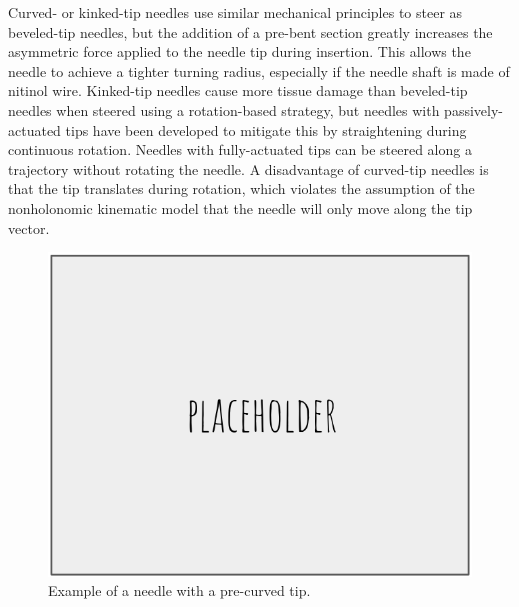 Curved- or kinked-tip needles use similar mechanical principles to steer as beveled-tip needles, but the addition of a pre-bent section greatly increases the asymmetric force applied to the needle tip during insertion\cite{reed_integrated_2008}. This allows the needle to achieve a tighter turning radius, especially if the needle shaft is made of nitinol wire. Kinked-tip needles cause more tissue damage than beveled-tip needles when steered using a rotation-based strategy, but needles with passively-actuated tips have been developed to mitigate this by straightening during continuous rotation\cite{swaney_flexure-based_2013}. Needles with fully-actuated tips can be steered along a trajectory without rotating the needle\cite{roesthuis_modeling_2015}. A disadvantage of curved-tip needles is that the tip translates during rotation, which violates the assumption of the nonholonomic kinematic model that the needle will only move along the tip vector\cite{reed_integrated_2008}.

\begin{figure}[h]
\includegraphics[width=1.0\textwidth]{Fig/placeholder.png}
\caption{Example of a needle with a pre-curved tip\cite{reed_integrated_2008}.}
\label{fig:kinked_tip}
\end{figure}

